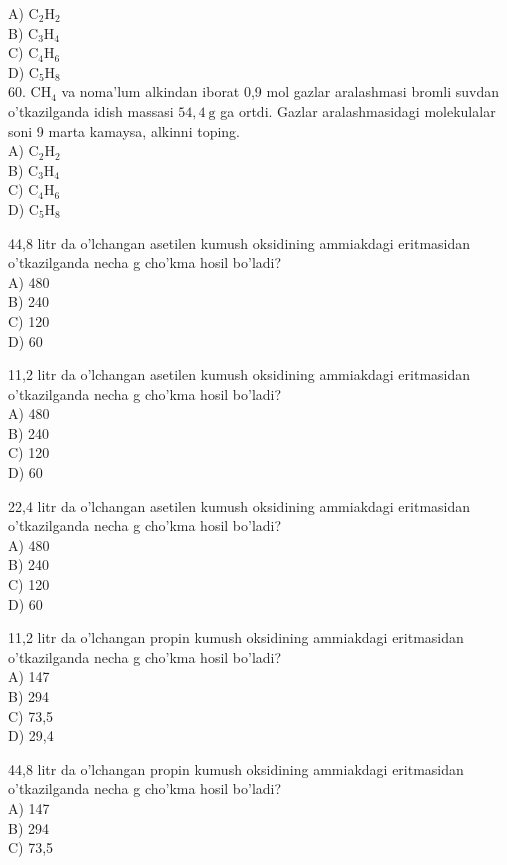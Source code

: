 A) $\mathrm{C}_{2} \mathrm{H}_{2}$\\
B) $\mathrm{C}_{3} \mathrm{H}_{4}$\\
C) $\mathrm{C}_{4} \mathrm{H}_{6}$\\
D) $\mathrm{C}_{5} \mathrm{H}_{8}$\\
60. $\mathrm{CH}_{4}$ va noma'lum alkindan iborat 0,9 mol gazlar aralashmasi bromli suvdan o'tkazilganda idish massasi $54,4 \mathrm{~g}$ ga ortdi. Gazlar aralashmasidagi molekulalar soni 9 marta kamaysa, alkinni toping.\\
A) $\mathrm{C}_{2} \mathrm{H}_{2}$\\
B) $\mathrm{C}_{3} \mathrm{H}_{4}$\\
C) $\mathrm{C}_{4} \mathrm{H}_{6}$\\
D) $\mathrm{C}_{5} \mathrm{H}_{8}$
  \item 44,8 litr da o'lchangan asetilen kumush oksidining ammiakdagi eritmasidan o'tkazilganda necha g cho'kma hosil bo'ladi?\\
A) 480\\
B) 240\\
C) 120\\
D) 60
  \item 11,2 litr da o'lchangan asetilen kumush oksidining ammiakdagi eritmasidan o'tkazilganda necha g cho'kma hosil bo'ladi?\\
A) 480\\
B) 240\\
C) 120\\
D) 60
  \item 22,4 litr da o'lchangan asetilen kumush oksidining ammiakdagi eritmasidan o'tkazilganda necha g cho'kma hosil bo'ladi?\\
A) 480\\
B) 240\\
C) 120\\
D) 60
  \item 11,2 litr da o'lchangan propin kumush oksidining ammiakdagi eritmasidan o'tkazilganda necha g cho'kma hosil bo'ladi?\\
A) 147\\
B) 294\\
C) 73,5\\
D) 29,4
  \item 44,8 litr da o'lchangan propin kumush oksidining ammiakdagi eritmasidan o'tkazilganda necha g cho'kma hosil bo'ladi?\\
A) 147\\
B) 294\\
C) 73,5\\
